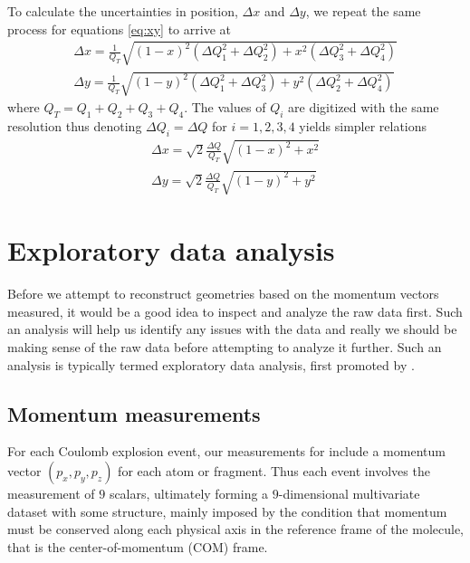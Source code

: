 To calculate the uncertainties in position, $\Delta x$ and $\Delta y$, we repeat the same process for equations \eqref{eq:xy} to arrive at
\begin{subequations}
  \begin{align}
  \Delta x = \frac{1}{Q_T} \sqrt{ (1-x)^2 (\Delta Q_1^2 + \Delta Q_2^2) + x^2 (\Delta Q_3^2 + \Delta Q_4^2)} \\  
  \Delta y = \frac{1}{Q_T} \sqrt{ (1-y)^2 (\Delta Q_1^2 + \Delta Q_3^2) + y^2 (\Delta Q_2^2 + \Delta Q_4^2)}
  \end{align}
\end{subequations}
where $Q_T = Q_1 + Q_2 + Q_3 + Q_4$. The values of $Q_i$ are digitized with the same resolution thus denoting $\Delta Q_i = \Delta Q$ for $i=1,2,3,4$ yields simpler relations
\begin{subequations}
  \begin{align}
  \Delta x = \sqrt{2} \frac{\Delta Q}{Q_T} \sqrt{(1-x)^2 + x^2} \\
  \Delta y = \sqrt{2} \frac{\Delta Q}{Q_T} \sqrt{(1-y)^2 + y^2}
  \end{align}
\end{subequations}


\section{Exploratory data analysis}
Before we attempt to reconstruct geometries based on the momentum vectors measured, it would be a good idea to inspect and analyze the raw data first. Such an analysis will help us identify any issues with the data and really we should be making sense of the raw data before attempting to analyze it further. Such an analysis is typically termed exploratory data analysis, first promoted by \citet{Tukey77}.

\subsection{Momentum measurements}
For each Coulomb explosion event, our measurements for  include a momentum vector $(p_x, p_y, p_z)$ for each atom or fragment. Thus each event involves the measurement of $9$ scalars, ultimately forming a $9$-dimensional multivariate dataset with some structure, mainly imposed by the condition that momentum must be conserved along each physical axis in the reference frame of the molecule, that is the center-of-momentum (COM) frame.

